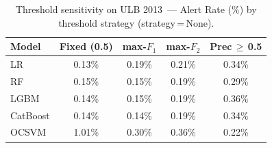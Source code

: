 \begin{table}[ht!]
\centering
\caption{Threshold sensitivity on ULB 2013~--- Alert Rate (\%) by threshold strategy (strategy\,=\,None).}
\label{tab:threshold_ulb_alert}
\begin{tabular}{l c c c c}
\toprule
Model & Fixed (0.5) & max-$F_1$ & max-$F_2$ & Prec\,$\geq$\,0.5 \\
\midrule
LR         & 0.13\% & 0.19\% & 0.21\% & 0.34\% \\
RF         & 0.15\% & 0.15\% & 0.19\% & 0.29\% \\
LGBM       & 0.14\% & 0.15\% & 0.19\% & 0.36\% \\
CatBoost   & 0.14\% & 0.14\% & 0.19\% & 0.34\% \\
OCSVM      & 1.01\% & 0.30\% & 0.36\% & 0.22\% \\
\bottomrule
\end{tabular}
\end{table}